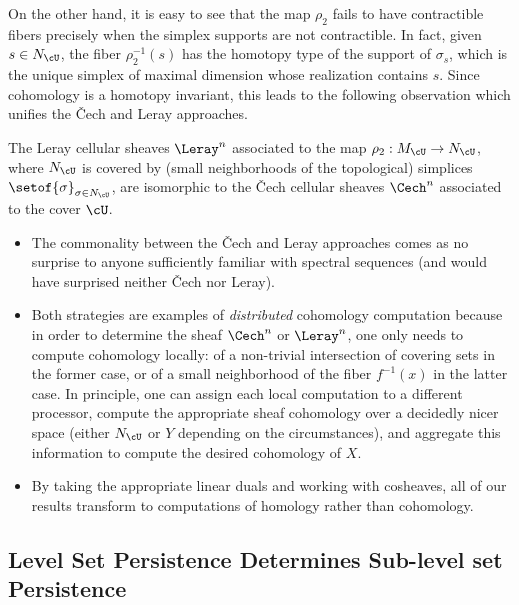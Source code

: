 On the other hand, it is easy to see that the map $\rho_2$ fails to have contractible fibers precisely when the simplex supports are not contractible. In fact, given $s \in N_\cU$, the fiber $\rho_2^{-1}(s)$ has the homotopy type of the support of $\sigma_s$, which is the unique simplex of maximal dimension whose realization contains $s$. Since cohomology is a homotopy invariant, this leads to the following observation which unifies the \v{C}ech and Leray approaches.

\begin{prop}
The Leray cellular sheaves $\Leray^n$ associated to the map $\rho_2: M_\cU \to N_\cU$, where $N_\cU$ is covered by (small neighborhoods of the topological) simplices $\setof{\sigma}_{\sigma \in N_\cU}$, are isomorphic to the \v{C}ech cellular sheaves $\Cech^n$ associated to the cover $\cU$.
\end{prop}

\begin{rem}
\begin{itemize}
\item The commonality between the \v{C}ech and Leray approaches comes as no surprise to anyone sufficiently familiar with spectral sequences (and would have surprised neither \v{C}ech nor Leray).
\item Both strategies are examples of {\em distributed} cohomology computation because in order to determine the sheaf $\Cech^n$ or $\Leray^n$, one only needs to compute cohomology locally: of a non-trivial intersection of covering sets in the former case, or of a small neighborhood of the fiber $f^{-1}(x)$ in the  latter case. In principle, one can assign each local computation to a different processor, compute the appropriate sheaf cohomology over a decidedly nicer space (either $N_\cU$ or $Y$ depending on the circumstances), and aggregate this information to compute the desired cohomology of $X$.
\item By taking the appropriate linear duals and working with cosheaves, all of our results transform to computations of homology rather than cohomology.
\end{itemize}
\end{rem}

\subsection{Level Set Persistence Determines Sub-level set Persistence}
\label{subsec:level2sub}

